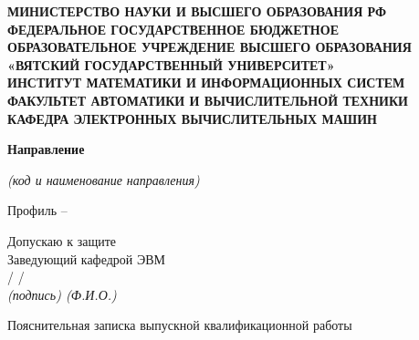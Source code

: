 \begin{titlepage}
	\newpage
	\singlespacing
	\vspace{0.8cm}
	\large

	\begin{center}
		\large
		\bfseries
		МИНИСТЕРСТВО НАУКИ И ВЫСШЕГО ОБРАЗОВАНИЯ РФ \\
		ФЕДЕРАЛЬНОЕ ГОСУДАРСТВЕННОЕ БЮДЖЕТНОЕ \\
		ОБРАЗОВАТЕЛЬНОЕ УЧРЕЖДЕНИЕ ВЫСШЕГО ОБРАЗОВАНИЯ \\
		«ВЯТСКИЙ ГОСУДАРСТВЕННЫЙ УНИВЕРСИТЕТ» \\
		ИНСТИТУТ МАТЕМАТИКИ И ИНФОРМАЦИОННЫХ СИСТЕМ \\
		ФАКУЛЬТЕТ АВТОМАТИКИ И ВЫЧИСЛИТЕЛЬНОЙ ТЕХНИКИ \\
		КАФЕДРА ЭЛЕКТРОННЫХ ВЫЧИСЛИТЕЛЬНЫХ МАШИН
	\end{center}

	\vspace{0.8cm}
	\begin{center}
		\textbf{Направление}
		\uline{\specialization}

		\small
		\textit{(код и наименование направления)}

		\large
		Профиль – \uline{\profile}
	\end{center}

	\vspace{0.8cm}
	\begin{flushright}
		{
			\onehalfspacing
			Допускаю к защите \\
			Заведующий кафедрой ЭВМ \\
		}
		\vspace{1mm}
		\uline{\hspace{3cm}} / \uline{\headofdepartment} / \\
		\vspace{1mm}
		\small
		\itshape
		(подпись) \hspace{1.8cm} (Ф.И.О.) \hspace{1.4cm}

	\end{flushright}

	\vspace{1.5cm}
	\begin{center}
		\huge
		\bfseries
		\topic
	\end{center}
	\vspace{0pt}
	\begin{center}
		Пояснительная записка выпускной квалификационной работы \\
		\tpga
	\end{center}


\end{titlepage}
